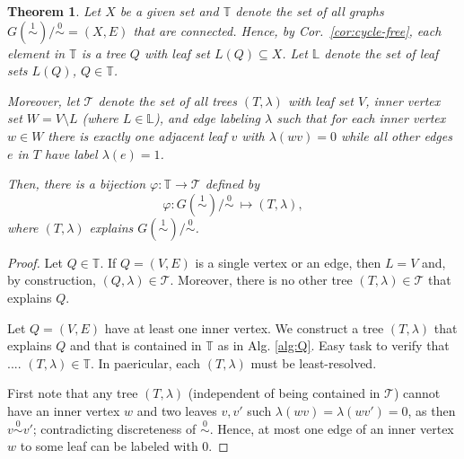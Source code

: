 \documentclass[smallextended]{svjour3}
\newcommand{\TODO}[1]{\begingroup\color{red}#1\endgroup}
\newcommand{\Ro}{\mathrel{\overset{0}{\sim}}}
\newcommand{\Rl}{\mathrel{\overset{1}{\sim}}}
\newtheorem{thm}{Theorem}
\begin{document}
\clearpage
\begin{thm}
	Let $X$ be a given set and  
	$\mathbb{T}$ denote the set of all graphs $G(\Rl)/\Ro = (X,E)$ that are connected.
	Hence, by Cor.\ \ref{cor:cycle-free}, each element in $\mathbb{T}$ is a tree $Q$
	with leaf set $L(Q)\subseteq X$.	Let $\mathbb L$ denote the set of leaf sets $L(Q)$, 
	$Q\in  \mathbb{T}$. 
	
	Moreover, let $\mathcal{T}$ denote the set of all trees $(T,\lambda)$ with leaf set
	$V$, inner vertex set $W = V\setminus L$ (where $L\in \mathbb L$), and edge labeling $\lambda$
	such that for each inner vertex $w\in W$ there is exactly one adjacent leaf $v$
	with $\lambda(wv)=0$ while all other edges $e$ in $T$ have label $\lambda(e)=1$. 
	
	Then, there is a bijection $\varphi : \mathbb{T} \to \mathcal{T}$
	defined by \[\varphi: G(\Rl)/\Ro \ \mapsto (T,\lambda), \] where
	$(T,\lambda)$ explains $G(\Rl)/\Ro$. 
	\label{thm:bijection}
\end{thm}
\begin{proof}
	Let $Q\in \mathbb{T}$. If $Q = (V,E)$ is a single vertex or an edge, then 
	$L=V$ and, by construction, $(Q,\lambda) \in \mathcal{T}$. Moreover, there 
	is no other tree $(T,\lambda)\in \mathcal{T}$ that explains $Q$. 

	Let $Q=(V,E)$ have at least one inner vertex. 
	We construct a tree $(T,\lambda)$ that explains $Q$ and that is contained in
	$\mathbb{T}$ as in Alg. \ref{alg:Q}.  
	\TODO{Easy task to verify that ....  $(T,\lambda)\in \mathbb{T}$.} 
	In paericular, each 	$(T,\lambda)$ must be least-resolved.
		

	

	First note that any tree $(T,\lambda)$ (independent of being contained in 
	$\mathcal{T}$) cannot have an inner vertex $w$ and two leaves $v,v'$ such
	$\lambda(wv) = \lambda(wv') = 0$, as then $v\Ro v'$; contradicting discreteness 
	of $\Ro$. Hence, at most one edge of an inner vertex $w$ to some leaf can
	be labeled with $0$. 



	
	

\end{proof}
\end{document}
